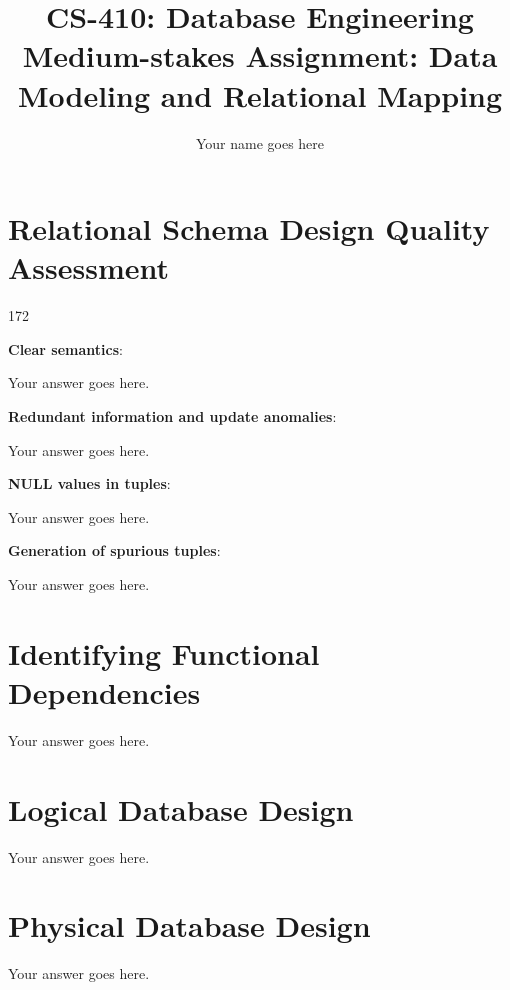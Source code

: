 \documentclass[11pt]{article}
\title{CS-410: Database Engineering \\ Medium-stakes Assignment: Data Modeling and Relational Mapping}
\author{Your name goes here}
\begin{document}
\maketitle
\thispagestyle{empty}
\tableofcontents
\newpage


\section{Relational Schema Design Quality Assessment} \label{sec:qualitative}


\begin{dingautolist}{172}

\item \textbf{Clear semantics}: 

    Your answer goes here.

\item \textbf{Redundant information and update anomalies}: 

    Your answer goes here.

\item \textbf{NULL values in tuples}: 

    Your answer goes here.

\item \textbf{Generation of spurious tuples}: 

    Your answer goes here.

\end{dingautolist}

\section{Identifying Functional Dependencies} \label{sec:fds}

    Your answer goes here.

\section{Logical Database Design} \label{sec:logical}

    Your answer goes here.

\section{Physical Database Design} \label{sec:physical}

    Your answer goes here.
\end{document}
